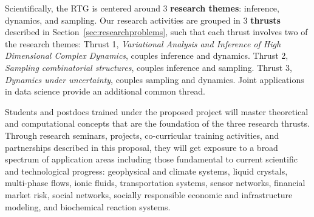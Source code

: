 \documentclass[11pt]{NSFamsart}
\begin{document}
Scientifically, the RTG is centered around 3 {\bf research themes}: inference, dynamics, and sampling. Our research activities are grouped in 3 {\bf thrusts} described in Section~\ref{sec:researchproblems}, such that each thrust involves two of the research themes: 
Thrust 1, \emph{Variational Analysis and Inference of High Dimensional Complex Dynamics}, couples inference and dynamics. 
Thrust 2, \emph{Sampling combinatorial structures}, couples inference and sampling. 
Thrust 3, \emph{Dynamics under uncertainty}, couples sampling and dynamics. 
Joint applications in data science provide an additional common thread.  %



Students and postdocs trained under the proposed project will master theoretical and computational concepts that are the foundation of the three research thrusts. Through research seminars, projects, co-curricular training activities, and partnerships described in this proposal, they will get exposure to a broad spectrum of application  areas including  those fundamental to current scientific and technological progress: geophysical and climate systems, liquid crystals, multi-phase flows, ionic fluids,  transportation systems, sensor networks, financial market risk, social networks, socially responsible economic and infrastructure modeling, and biochemical reaction systems.
\end{document}
